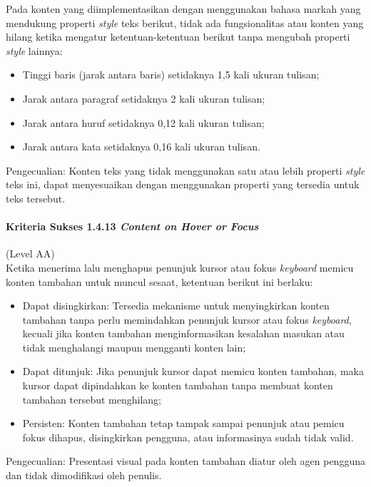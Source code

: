 \documentclass[a4paper,twoside]{article}
\begin{document}
\begin{enumerate}
		Pada konten yang diimplementasikan dengan menggunakan bahasa markah yang mendukung properti \textit{style} teks berikut, tidak ada fungsionalitas atau konten yang hilang ketika mengatur ketentuan-ketentuan berikut tanpa mengubah properti \textit{style} lainnya:

		\begin{itemize}
			\item Tinggi baris (jarak antara baris) setidaknya 1,5 kali ukuran tulisan;
			\item Jarak antara paragraf setidaknya 2 kali ukuran tulisan;
			\item Jarak antara huruf setidaknya 0,12 kali ukuran tulisan;
			\item Jarak antara kata setidaknya 0,16 kali ukuran tulisan.
		\end{itemize}

		Pengecualian: Konten teks yang tidak menggunakan satu atau lebih properti \textit{style} teks ini, dapat menyesuaikan dengan menggunakan properti yang tersedia untuk teks tersebut.

		\paragraph{Kriteria Sukses 1.4.13 \textit{Content on Hover or Focus}}
		\label{sec:kriteria_sukses_1.4.13}
		(Level AA)\\

		Ketika menerima lalu menghapus penunjuk kursor atau fokus \textit{keyboard} memicu konten tambahan untuk muncul sesaat, ketentuan berikut ini berlaku:

		\begin{itemize}
			\item Dapat disingkirkan: Tersedia mekanisme untuk menyingkirkan konten tambahan tanpa perlu memindahkan penunjuk kursor atau fokus \textit{keyboard}, kecuali jika konten tambahan menginformasikan kesalahan masukan atau tidak menghalangi maupun mengganti konten lain;
			\item Dapat ditunjuk: Jika penunjuk kursor dapat memicu konten tambahan, maka kursor dapat dipindahkan ke konten tambahan tanpa membuat konten tambahan tersebut menghilang;
			\item Persisten: Konten tambahan tetap tampak sampai penunjuk atau pemicu fokus dihapus, disingkirkan pengguna, atau informasinya sudah tidak valid.
		\end{itemize}

		Pengecualian: Presentasi visual pada konten tambahan diatur oleh agen pengguna dan tidak dimodifikasi oleh penulis.


\end{enumerate}
\end{document}
